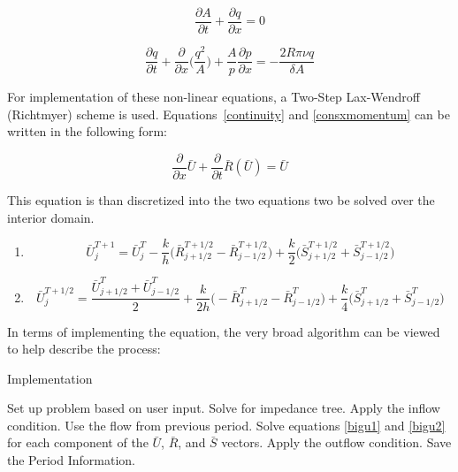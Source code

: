 \documentclass[12pt]{article}
\newcommand{\partder}[2]{\frac{\partial #1}{\partial #2}}
\newcommand{\tensor}[1]{\bar{#1}}
\newcommand{\tensplus}[3]{\tensor{#1}_{#2}^{#3}}
\begin{document}
\begin{equation}
	\label{continuity}
	\partder{A}{t} + \partder{q}{x} = 0
\end{equation}

\begin{equation}
	\label{consxmomentum}
	\partder{q}{t} + \partder{}{x}\Bigg(\frac{q^2}{A}\Bigg) + \frac{A}{p}\partder{p}{x} = -\frac{2R\pi \nu q}{\delta A}
\end{equation}

For implementation of these non-linear equations, a Two-Step Lax-Wendroff (Richtmyer) scheme is used. Equations~\ref{continuity} and \ref{consxmomentum} can be written in the following form:

\begin{equation} 
	\label{discrete1}
	\partder{}{x} \tensor{U} + \partder{}{t} \tensor{R}(\tensor{U}) = \tensor{U}
\end{equation}

This equation is than discretized into the two equations two be solved over the interior domain. 

\begin{enumerate}
	\item
	\begin{equation}
		\label{bigu1}
		\tensplus{U}{j}{T+1} = \tensplus{U}{j}{T} - \frac{k}{h} \Bigg(\tensplus{R}{j+1/2}{T+1/2} - \tensplus{R}{j-1/2}{T+1/2} \Bigg) + \frac{k}{2} \Bigg(\tensplus{S}{j		+1/2}{T+1/2} + \tensplus{S}{j-1/2}{T+1/2} \Bigg)
	\end{equation}
	
	\item
	\begin{equation}
		\label{bigu2}
		\tensplus{U}{j}{T+1/2} = \frac{\tensplus{U}{j+1/2}{T} + \tensplus{U}{j-1/2}{T}}{2} + \frac{k}{2h} \Bigg(-\tensplus{R}{j+1/2}{T} - \tensplus{R}{j-1/2}{T} \Bigg)  		+ \frac{k}{4} \Bigg(\tensplus{S}{j+1/2}{T} + \tensplus{S}{j-1/2}{T} \Bigg)
	\end{equation}
\end{enumerate}

In terms of implementing the equation, the very broad algorithm can be viewed to help describe the process:

\begin{algorithm}
\caption{Implementation}\label{euclid}
\begin{algorithmic}[1]
\State Set up problem based on user input.
\State Solve for impedance tree.
		\State Apply the inflow condition.
	\Else
		\State Use the flow from previous period.
	\EndIf
			\State Solve equations \ref{bigu1} and \ref{bigu2} for each component of the $\tensor{U}$, $\tensor{R}$, and $\tensor{S}$ vectors.
		\EndFor
	\State Apply the outflow condition.
	\EndFor
\State Save the Period Information.
\EndFor
\end{algorithmic}
\end{algorithm}
\end{document}

